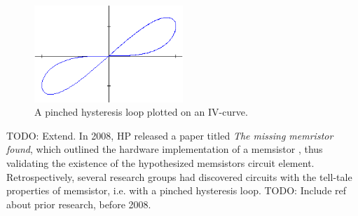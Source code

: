 \documentclass[12pt, a4paper]{article}
\begin{document}
\begin{figure}[htbp]
	\begin{center}
		\includegraphics[width=0.5\textwidth]{inc/pinched_hysteresis.png}
		\caption{A pinched hysteresis loop plotted on an IV-curve.\protect\footnotemark}
		\label{fig:pinched_hysteresis}
	\end{center}
\end{figure}

TODO: Extend. In 2008, HP released a paper titled \textit{The missing memristor found}, which outlined the hardware implementation of a memsistor \cite{hp_memristor_found}, thus validating the existence of the hypothesized memsistors circuit element. Retrospectively, several research groups had discovered circuits with the tell-tale properties of memsistor, i.e. with a pinched hysteresis loop. TODO: Include ref about prior research, before 2008.

%
%
%
%
%
%
%
%

%

%
\end{document}
